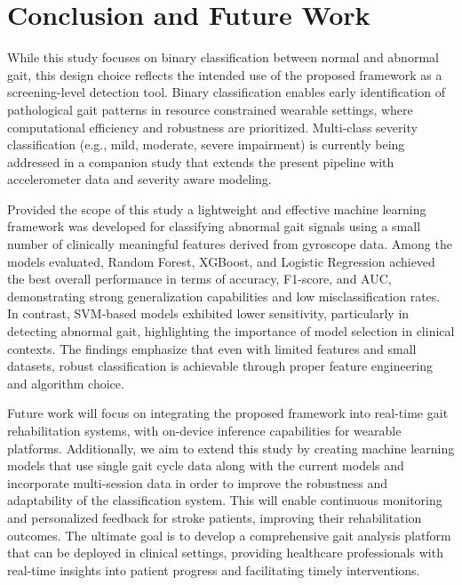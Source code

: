 \section{Conclusion and Future Work}
\label{sec:conclusion}
While this study focuses on binary classification between normal and abnormal gait, this design choice reflects the intended use of the proposed framework as a
screening-level detection tool. Binary classification enables early identification of pathological gait patterns in resource constrained wearable settings, where
computational efficiency and robustness are prioritized. Multi-class severity classification (e.g., mild, moderate, severe impairment) is currently being addressed 
in a companion study that extends the present pipeline with accelerometer data and severity aware modeling.

Provided the scope of this study a lightweight and effective machine learning framework was developed for classifying abnormal gait signals using a small number of 
clinically meaningful features derived from gyroscope data. Among the models evaluated, Random Forest, XGBoost, and Logistic Regression achieved the best overall 
performance in terms of accuracy, F1-score, and AUC, demonstrating strong generalization capabilities and low misclassification rates. In contrast, SVM-based models 
exhibited lower sensitivity, particularly in detecting abnormal gait, highlighting the importance of model selection in clinical contexts. The findings emphasize 
that even with limited features and small datasets, robust classification is achievable through proper feature engineering and algorithm choice.

Future work will focus on integrating the proposed framework into real-time gait rehabilitation systems, with on-device inference capabilities for wearable platforms. 
Additionally, we aim to extend this study by creating machine learning models that use single gait cycle data along with the current models and incorporate multi-session 
data in order to improve the robustness and adaptability of the classification system. This will enable continuous monitoring and personalized feedback for stroke patients, 
improving their rehabilitation outcomes. The ultimate goal is to develop a comprehensive gait analysis platform that can be deployed in clinical settings, providing 
healthcare professionals with real-time insights into patient progress and facilitating timely interventions.